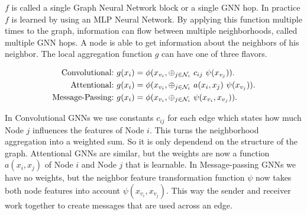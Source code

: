$f$ is called a single Graph Neural Network block or a single GNN hop. In practice $f$ is learned by using an MLP Neural Network. By applying this function multiple times to the graph, information can flow between multiple neighborhoods, called multiple GNN hops. A node is able to get information about the neighbors of his neighbor. The local aggregation function $g$ can have one of three flavors.

\begin{equation}
    \begin{aligned}
        \textup{Convolutional:}\ & g(x_i) = \phi(x_{v_i}, \oplus_{j \in \mathcal{N}_i}\ c_{ij}\ \psi(x_{v_j})).\\
        \textup{Attentional:}\ & g(x_i) = \phi(x_{v_i}, \oplus_{j \in \mathcal{N}_i}\ a(x_i,x_j)\ \psi(x_{v_j})).\\
        \textup{Message-Passing:}\ & g(x_i) = \phi(x_{v_i}, \oplus_{j \in \mathcal{N}_i}\ \psi(x_{v_i}, x_{v_j})). \\
    \end{aligned}
    \nonumber
\end{equation}

In Convolutional GNNs we use constants $c_{ij}$ for each edge which states how much Node $j$ influences the features of Node $i$. This turns the neighborhood aggregation into a weighted sum. So it is only dependend on the structure of the graph. Attentional GNNs are similar, but the weights are now a function $a(x_i,x_j)$ of Node $i$ and Node $j$ that is learnable. In Message-passing GNNs we have no weights, but the neighbor feature transformation function $\psi$ now takes both node features into account $\psi(x_{v_i}, x_{v_j})$. This way the sender and receiver work together to create messages that are used across an edge. \par




